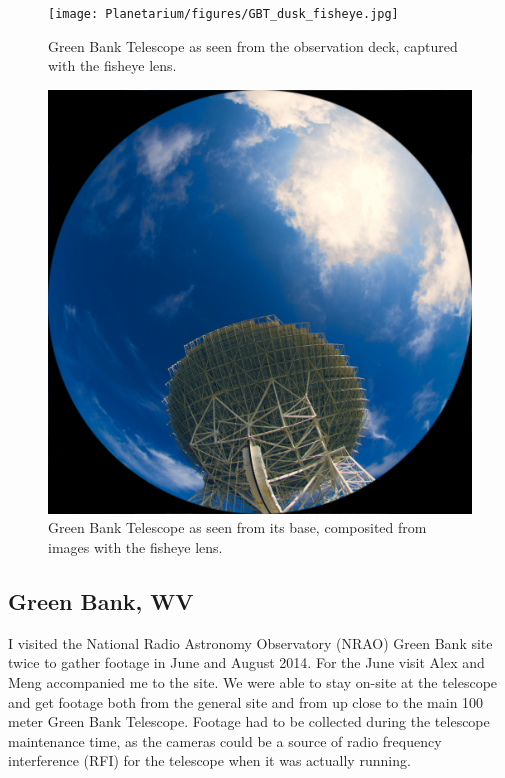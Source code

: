\begin{figure}[htb]
\centering
\begin{minipage}[b]{0.51\textwidth}
\centering
\texttt{[image: Planetarium/figures/GBT\_dusk\_fisheye.jpg]}
\caption{Green Bank Telescope as seen from the observation deck, captured with the fisheye lens.}
\label{Fig:GBT_dusk_fisheye}
\end{minipage}%
\begin{minipage}[b]{0.02\textwidth}
\hspace{1cm}
\end{minipage}%
\begin{minipage}[b]{0.43\textwidth}
\centering
\includegraphics[width=0.95\linewidth]{Planetarium/figures/GBT_base_render.jpg}
\caption{Green Bank Telescope as seen from its base, composited from images with the fisheye lens.}
\label{Fig:GBT_base_fisheye}
\end{minipage}
\end{figure}

\subsection{Green Bank, WV}
I visited the National Radio Astronomy Observatory (NRAO) Green Bank site twice to gather footage in June and August 2014. For the June visit Alex and Meng accompanied me to the site. We were able to stay on-site at the telescope and get footage both from the general site and from up close to the main 100 meter Green Bank Telescope. Footage had to be collected during the telescope maintenance time, as the cameras could be a source of radio frequency interference (RFI) for the telescope when it was actually running.

